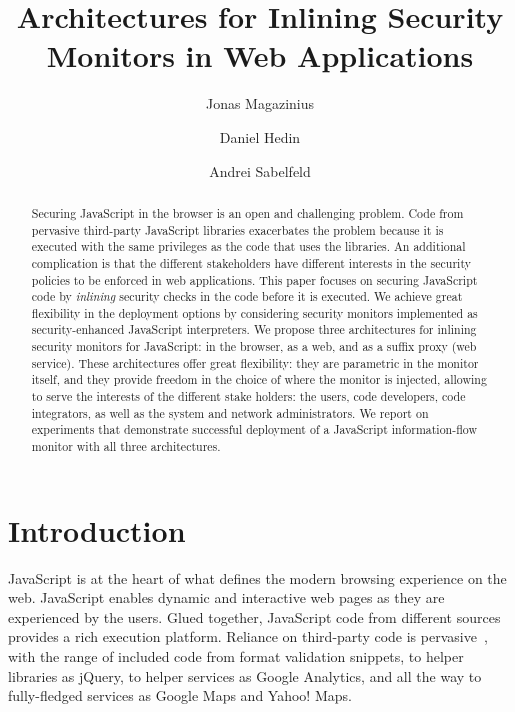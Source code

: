\documentclass{llncs}
\title{Architectures for Inlining Security Monitors in Web Applications}
\author{Jonas Magazinius \and Daniel Hedin \and Andrei Sabelfeld}
\institute{Chalmers University of Technology, Gothenburg, Sweden}
\begin{document}
\maketitle



\begin{abstract}
Securing JavaScript in the browser is an open and challenging
problem. Code from pervasive third-party JavaScript libraries exacerbates the
problem because it is executed with the same privileges as the code
that uses the libraries.
%
An additional complication is that the different stakeholders have
different interests in the security policies to be enforced
in web applications.
%
This paper focuses on securing JavaScript code by \emph{inlining}
security checks in the code before it is executed.
%
We achieve great flexibility in the deployment options by considering
security monitors implemented as security-enhanced JavaScript interpreters.
%
We propose three architectures for inlining security monitors for JavaScript: in
the browser, as a web, and as a suffix proxy (web service). 
%
These architectures offer great flexibility: they are parametric in the monitor itself,
and they provide freedom in the choice of where the monitor is
injected, allowing to serve the interests of the different stake
holders: the users, code developers, code
integrators, as well as the system and network administrators.
%
We report on experiments that demonstrate successful deployment of a JavaScript
information-flow monitor with all three architectures.
\end{abstract}










\section{Introduction}
\label{sec:intro}
JavaScript is at the heart of what defines the modern
browsing experience on the web. JavaScript enables dynamic and interactive
web pages as they are experienced by the users. Glued together,
JavaScript code from different sources provides
a rich execution platform. Reliance on third-party code is
pervasive~\cite{Nikiforakis+:CCS12}, with the range of included code from
format validation snippets, to helper
libraries as jQuery, to helper services as Google Analytics, and all the way to fully-fledged services as
Google Maps and Yahoo! Maps.
\end{document}
